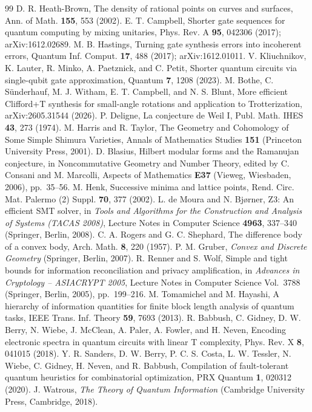 \documentclass[aps,prx,twocolumn,superscriptaddress,nofootinbib,longbibliography]{revtex4-2}
\theoremstyle{plain}
\theoremstyle{definition}
\theoremstyle{remark}
\begin{document}
\begin{thebibliography}{99}
 D. R. Heath-Brown, The density of rational points on curves and surfaces, Ann. of Math. \textbf{155}, 553 (2002).
 E. T. Campbell, Shorter gate sequences for quantum computing by mixing unitaries, Phys. Rev. A \textbf{95}, 042306 (2017); arXiv:1612.02689.
 M. B. Hastings, Turning gate synthesis errors into incoherent errors, Quantum Inf. Comput. \textbf{17}, 488 (2017); arXiv:1612.01011.
 V. Kliuchnikov, K. Lauter, R. Minko, A. Paetznick, and C. Petit, Shorter quantum circuits via single-qubit gate approximation, Quantum \textbf{7}, 1208 (2023).
 M. Bothe, C. S\"underhauf, M. J. Witham, E. T. Campbell, and N. S. Blunt, More efficient Clifford+T synthesis for small-angle rotations and application to Trotterization, arXiv:2605.31544 (2026).
 P. Deligne, La conjecture de Weil I, Publ. Math. IHES \textbf{43}, 273 (1974).
 M. Harris and R. Taylor, The Geometry and Cohomology of Some Simple Shimura Varieties, Annals of Mathematics Studies \textbf{151} (Princeton University Press, 2001).
 D. Blasius, Hilbert modular forms and the Ramanujan conjecture, in Noncommutative Geometry and Number Theory, edited by C. Consani and M. Marcolli, Aspects of Mathematics \textbf{E37} (Vieweg, Wiesbaden, 2006), pp.~35--56.
 M. Henk, Successive minima and lattice points, Rend. Circ. Mat. Palermo (2) Suppl. \textbf{70}, 377 (2002).
 L. de Moura and N. Bj{\o}rner, Z3: An efficient SMT solver, in \emph{Tools and Algorithms for the Construction and Analysis of Systems (TACAS 2008)}, Lecture Notes in Computer Science \textbf{4963}, 337--340 (Springer, Berlin, 2008).
 C. A. Rogers and G. C. Shephard, The difference body of a convex body, Arch. Math. \textbf{8}, 220 (1957).
 P. M. Gruber, \emph{Convex and Discrete Geometry} (Springer, Berlin, 2007).
 R. Renner and S. Wolf, Simple and tight bounds for information reconciliation and privacy amplification, in \emph{Advances in Cryptology -- ASIACRYPT 2005}, Lecture Notes in Computer Science Vol.~3788 (Springer, Berlin, 2005), pp.~199--216.
 M. Tomamichel and M. Hayashi, A hierarchy of information quantities for finite block length analysis of quantum tasks, IEEE Trans. Inf. Theory \textbf{59}, 7693 (2013).
 R. Babbush, C. Gidney, D. W. Berry, N. Wiebe, J. McClean, A. Paler, A. Fowler, and H. Neven, Encoding electronic spectra in quantum circuits with linear T complexity, Phys. Rev. X \textbf{8}, 041015 (2018).
 Y. R. Sanders, D. W. Berry, P. C. S. Costa, L. W. Tessler, N. Wiebe, C. Gidney, H. Neven, and R. Babbush, Compilation of fault-tolerant quantum heuristics for combinatorial optimization, PRX Quantum \textbf{1}, 020312 (2020).
 J. Watrous, \emph{The Theory of Quantum Information} (Cambridge University Press, Cambridge, 2018).
\end{thebibliography}
\end{document}
